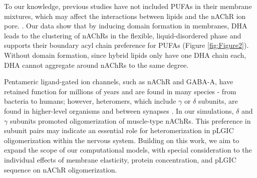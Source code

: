 


To our knowledge, previous studies have not included PUFAs in their membrane mixtures, which may affect the interactions between lipids and the nAChR ion pore. \cite{Fong_Correlation_1986,Sunshine_Lipid_1992,Butler1993,Fong_Stabilization_1987,Corrie_Lipid_2002}. Our data show that by inducing domain formation in membranes, DHA leads to the clustering of nAChRs in the flexible, liquid-disordered phase and supports their boundary acyl chain preference for PUFAs (Figure \ref{fig:Figure2}). Without domain formation, since hybrid lipids only have one DHA chain each, DHA cannot aggregate around nAChRs to the same degree. 


Pentameric ligand-gated ion channels, such as nAChR and GABA-A, have retained function for millions of years and are found in many species - from bacteria to humans; however, heteromers, which include $\gamma$ or $\delta$ subunits, are found in higher-level organisms and between synapses \cite{Jaiteh2016}. In our simulations, $\delta$ and $\gamma$ subunits promoted oligomerization of muscle-type nAChRs. This preference in subunit pairs may indicate an essential role for heteromerization in pLGIC oligomerization within the nervous system. Building on this work, we aim to expand the scope of our computational models, with special consideration to the individual effects of membrane elasticity, protein concentration, and pLGIC sequence on nAChR oligomerization.  







